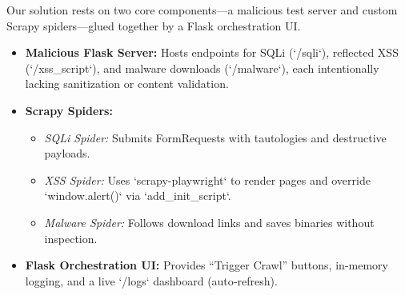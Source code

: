 


Our solution rests on two core components—a malicious test server and custom Scrapy spiders—glued together by a Flask orchestration UI.

\begin{itemize}
  \item \textbf{Malicious Flask Server:} Hosts endpoints for SQLi (`/sqli`), reflected XSS (`/xss_script`), and malware downloads (`/malware`), each intentionally lacking sanitization or content validation.
  \item \textbf{Scrapy Spiders:}
    \begin{itemize}
      \item \emph{SQLi Spider:} Submits FormRequests with tautologies and destructive payloads.
      \item \emph{XSS Spider:} Uses `scrapy-playwright` to render pages and override `window.alert()` via `add_init_script`.
      \item \emph{Malware Spider:} Follows download links and saves binaries without inspection.
    \end{itemize}
  \item \textbf{Flask Orchestration UI:} Provides “Trigger Crawl” buttons, in‐memory logging, and a live `/logs` dashboard (auto‐refresh).
\end{itemize}

